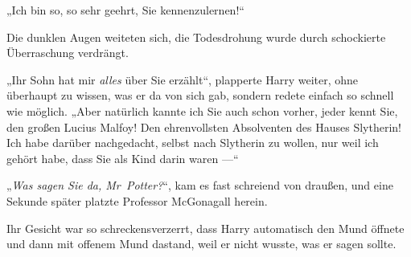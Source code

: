 „Ich bin so, so sehr geehrt, Sie kennenzulernen!“

Die dunklen Augen weiteten sich, die Todesdrohung wurde durch schockierte Überraschung verdrängt.

„Ihr Sohn hat mir \emph{alles} über Sie erzählt“, plapperte Harry weiter, ohne überhaupt zu wissen, was er da von sich gab, sondern redete einfach so schnell wie möglich.
„Aber natürlich kannte ich Sie auch schon vorher, jeder kennt Sie, den großen Lucius Malfoy! Den ehrenvollsten Absolventen des Hauses Slytherin! Ich habe darüber nachgedacht, selbst nach Slytherin zu wollen, nur weil ich gehört habe, dass Sie als Kind darin waren —“

„\emph{Was sagen Sie da, Mr~Potter?}“, kam es fast schreiend von draußen, und eine Sekunde später platzte Professor McGonagall herein.

Ihr Gesicht war so schreckensverzerrt, dass Harry automatisch den Mund öffnete und dann mit offenem Mund dastand, weil er nicht wusste, was er sagen sollte.

